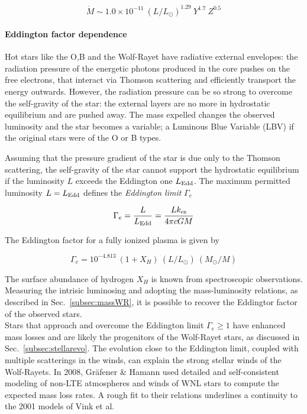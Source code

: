 \documentclass[a4paper,titlepage]{book}     	%
\newcommand{\mdot}{\ensuremath{\dot{M}}}
\begin{document}
\begin{equation}\label{eq:NugisLamers2000}
	\mdot \sim 1.0 \times 10^{-11}~(L/L_\odot)^{1.29}~Y^{1.7}~Z^{0.5}
\end{equation}

\paragraph{Eddington factor dependence}
Hot stars like the O,B and the Wolf-Rayet have radiative external envelopes: the radiation pressure of the energetic photons produced in the core pushes on the free electrons, that interact via Thomson scattering and efficiently transport the energy outwards. However, the radiation pressure can be so strong to overcome the self-gravity of the star: the external layers are no more in hydrostatic equilibrium and are pushed away. The mass expelled changes the observed luminosity and the star becomes a variable; a Luminous Blue Variable (LBV) if the original stars were of the O or B types.

Assuming that the pressure gradient of the star is due only to the Thomson scattering, the self-gravity of the star cannot support the hydrostatic equilibrium if the luminosity $L$ exceeds the Eddington one $L_{\rm Edd}$. The maximum permitted luminosity $L=L_{\rm Edd}$ defines the \emph{Eddington limit} $\Gamma_e$

\begin{equation}\label{eqn:Eddingtonfactor}
\Gamma_e = \frac{L}{L_\textup{Edd}} = \frac{L k_\textup{es}}{4 \pi c G M}
\end{equation}

The Eddington factor for a fully ionized plasma is given by

\begin{equation}\label{eq:EddingtonObserved}
\Gamma_e = 10^{-4.813}~(1+X_H)~(L/L_\odot)~(M_\odot/M)
\end{equation}

The surface abundance of hydrogen $X_H$ is known from spectroscopic observations. Measuring the intrisic luminosing and adopting the mass-luminosity relations, as described in Sec.\ \ref{subsec:massWR}, it is possible to recover the Eddingtor factor of the observed stars.\\


Stars that approach and overcome the Eddington limit $\Gamma_e \geq 1$ have enhanced mass losses and are likely the progenitors of the Wolf-Rayet stars, as discussed in Sec.\ \ref{subsec:stellarevo}. The evolution close to the Eddington limit, coupled with multiple scatterings in the winds, can explain the strong stellar winds of the Wolf-Rayets. In 2008, Gr{\"a}fener \& Hamann \cite{G&H_WRmassloss} used detailed and self-consistent modeling of non-LTE atmospheres and winds of WNL stars to compute the expected mass loss rates. A rough fit \cite{parsec2015_chen} to their relations underlines a continuity to the 2001 models of Vink et al.\
\end{document}
